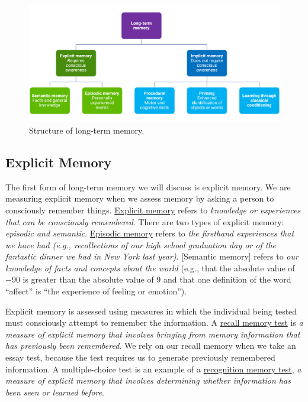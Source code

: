 \documentclass[
]{krantz}
\begin{document}
\begin{figure}

{\centering \includegraphics[width=0.9\linewidth]{images/ch5/fig2} 

}

\caption{Structure of long-term memory.}\label{fig:structure}
\end{figure}

\hypertarget{explicit-memory}{%
\subsection*{Explicit Memory}\label{explicit-memory}}


The first form of long-term memory we will discuss is explicit memory. We are measuring explicit memory when we assess memory by asking a person to consciously remember things. \protect\hyperlink{explicit-memory}{Explicit memory} refers to \emph{knowledge or experiences that can be consciously remembered}. There are two types of explicit memory: \emph{episodic and semantic}. \protect\hyperlink{episodic-memory}{Episodic memory} refers to \emph{the firsthand experiences that we have had (e.g., recollections of our high school graduation day or of the fantastic dinner we had in New York last year)}. {[}Semantic memory{]} refers to \emph{our knowledge of facts and concepts about the world} (e.g., that the absolute value of −90 is greater than the absolute value of 9 and that one definition of the word ``affect'' is ``the experience of feeling or emotion'').

Explicit memory is assessed using measures in which the individual being tested must consciously attempt to remember the information. A \protect\hyperlink{recall-memory-test}{recall memory test} is \emph{a measure of explicit memory that involves bringing from memory information that has previously been remembered}. We rely on our recall memory when we take an essay test, because the test requires us to generate previously remembered information. A multiple-choice test is an example of a \protect\hyperlink{recognition-memory-test}{recognition memory test}, \emph{a measure of explicit memory that involves determining whether information has been seen or learned before}.
\end{document}

